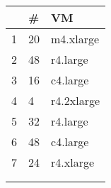 {\scriptsize
\begin{tabular}{@{}lll@{}}
\toprule
     & \#      & VM         \\ \midrule
1    & 20     & m4.xlarge  \\
2    & 48     & r4.large   \\
3    & 16     & c4.large   \\
4    & 4      & r4.2xlarge \\
5    & 32     & r4.large   \\
6    & 48     & c4.large   \\
7    & 24     & r4.xlarge  \\
     &        &            \\
     &        &            \\ \bottomrule
\end{tabular}
}
